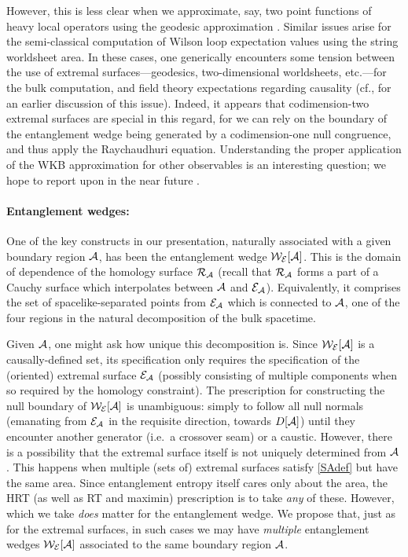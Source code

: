 \documentclass[12pt]{article}
\def\regA{{\cal A}}
\def\domdA{D[\regA]}
\def\extr{{\cal E}_\regA}
\def\homsurfA{{\cal R}_{\regA}}
\def\EWA{{\cal W}_{\cal E}[\regA]}
\begin{document}
However, this is less clear when we approximate, say, two point functions of heavy local operators using the geodesic approximation \cite{Balasubramanian:1999zv}. Similar issues arise for the semi-classical computation of Wilson loop expectation values \cite{Maldacena:1998im,Rey:1998ik} using the string worldsheet area. In these cases, one generically encounters some tension between the use of extremal surfaces---geodesics, two-dimensional worldsheets, etc.---for the bulk computation, and field theory expectations regarding causality (cf., \cite{Louko:2000tp} for an earlier discussion of this issue). Indeed, it appears that codimension-two extremal surfaces are special in this regard, for we can rely  on the boundary of the entanglement wedge being generated by a codimension-one null congruence, and thus apply the Raychaudhuri equation. Understanding the proper application of the WKB approximation for other observables is an interesting question; we hope to report upon in the near future \cite{Headrick:2014gf}.

\paragraph{Entanglement wedges:}
One of the key constructs in our presentation, naturally associated with a given boundary region $\regA$, has been the entanglement wedge $\EWA$.  This is the domain of dependence of the homology surface $\homsurfA$ (recall that $\homsurfA$ forms a part of a Cauchy surface which interpolates between $\regA$ and $\extr$).  Equivalently, it comprises the set of spacelike-separated points from $\extr$ which is connected to $\regA$, one of the four regions in the natural decomposition of the bulk spacetime.

Given $\regA$, one might ask how unique this decomposition is.  Since $\EWA$ is a causally-defined set, its specification only requires the specification of the (oriented) extremal surface $\extr$ (possibly consisting of multiple components when so required by the homology constraint).  The prescription for constructing the null boundary of $\EWA$ is unambiguous: simply to follow all null normals (emanating from $\extr$ in the requisite direction, towards $\domdA$) until they encounter another generator (i.e.\ a crossover seam) or a caustic.  
However, there is a possibility that the extremal surface itself is not uniquely determined from $\regA$.  This happens when multiple (sets of) extremal surfaces satisfy \eqref{SAdef} but have the same area.  Since entanglement entropy itself cares only about the area, the HRT (as well as RT and maximin) prescription is to take {\it any} of these.  However, which we take {\it does} matter for the entanglement wedge.  We propose that, just as for the extremal surfaces, in such cases we may have {\it multiple} entanglement wedges $\EWA$ associated to the same boundary region $\regA$.  
\end{document}
